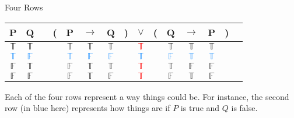 \documentclass[
  ignorenonframetext,
]{beamer}
\renewcommand{\,}{\text{, }}
\def\True{\mathbb{T}}
\def\False{\mathbb{F}}
\begin{document}
\begin{frame}{Four Rows}
\protect\hypertarget{four-rows}{}

\begin{center}
\begin{tabular}{@{ }c@{ }@{ }c | c@{ }@{}c@{}@{ }c@{ }@{ }c@{ }@{ }c@{ }@{}c@{}@{ }c@{ }@{}c@{}@{ }c@{ }@{ }c@{ }@{ }c@{ }@{}c@{}@{ }c}
P & Q &  & ( & P & $\rightarrow$ & Q & ) & $\lor$ & ( & Q & $\rightarrow$ & P & ) & \\
\hline 
$\True$ & $\True$ &  &  & $\True$ & $\True$ & $\True$ &  & \textcolor{red}{$\True$} &  & $\True$ & $\True$ & $\True$ &  & \\
\textcolor{dodgerblue}{$\True$} & \textcolor{dodgerblue}{$\False$} &  &  & \textcolor{dodgerblue}{$\True$} & \textcolor{dodgerblue}{$\False$} & \textcolor{dodgerblue}{$\False$} &  & \textcolor{red}{\textcolor{dodgerblue}{$\True$}} &  & \textcolor{dodgerblue}{$\False$} & \textcolor{dodgerblue}{$\True$} & \textcolor{dodgerblue}{$\True$} &  & \\
$\False$ & $\True$ &  &  & $\False$ & $\True$ & $\True$ &  & \textcolor{red}{$\True$} &  & $\True$ & $\False$ & $\False$ &  & \\
$\False$ & $\False$ &  &  & $\False$ & $\True$ & $\False$ &  & \textcolor{red}{$\True$} &  & $\False$ & $\True$ & $\False$ &  & \\
\end{tabular}
\bigskip
\end{center}

Each of the four rows represent a way things could be. For instance, the
second row (in blue here) represents how things are if \(P\) is true and
\(Q\) is false.

\end{frame}
\end{document}
